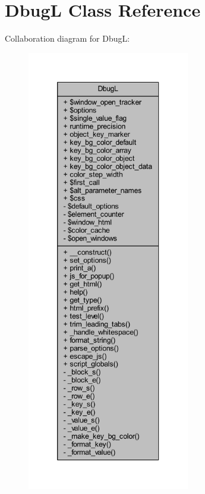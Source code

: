 \hypertarget{class_dbug_l}{}\section{DbugL Class Reference}
\label{class_dbug_l}


Collaboration diagram for DbugL\+:
\nopagebreak
\begin{figure}[H]
\begin{center}
\leavevmode
\includegraphics[height=550pt]{class_dbug_l__coll__graph}
\end{center}
\end{figure}

